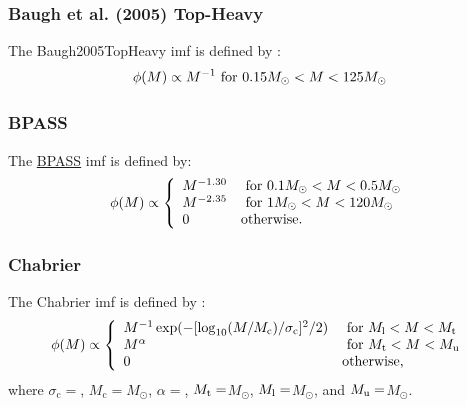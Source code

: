 \subsubsection{Baugh et al. (2005) Top-Heavy}

The {\normalfont \ttfamily Baugh2005TopHeavy} \gls{imf} is defined by \citep{baugh_can_2005}:
\begin{equation}
 \phi(M) \propto 
 M^{-1} \hbox{ for } 0.15M_\odot < M < 125M_\odot
\end{equation}

\subsubsection{BPASS}

The \href{http://www.bpass.org.uk/}{\normalfont \ttfamily BPASS} \gls{imf} is defined by:
\begin{equation}
 \phi(M) \propto \left\{ \begin{array}{ll}
 M^{-1.30} & \hbox{ for } 0.1M_\odot < M < 0.5M_\odot \\ 
 M^{-2.35} & \hbox{ for } 1M_\odot < M < 120M_\odot \\ 
0 & \hbox {otherwise.} \end{array} \right.
\end{equation}

\subsubsection{Chabrier}

The {\normalfont \ttfamily Chabrier} \gls{imf} is defined by \citep{chabrier_galactic_2001}:
\begin{equation}
 \phi(M) \propto \left\{ \begin{array}{ll}
 M^{-1} \exp(-[\log_{10}(M/M_{\mathrm c})/\sigma_{\mathrm c}]^2/2) & \hbox{ for } M_{\rm l} < M < M_{\rm t}  \\
 M^\alpha & \hbox{ for } M_{\rm t} < M < M_{\rm u} \\
 0 & \hbox {otherwise,} \end{array} \right.
\end{equation}
where $\sigma_{\mathrm c}=${\normalfont \ttfamily [imfChabrierSigma]}, $M_{\mathrm c}=${\normalfont \ttfamily [imfChabrierMass]}$M_\odot$, $\alpha=${\normalfont \ttfamily [imfChabrierExponent]}, $M_{\rm t}=${\normalfont \ttfamily [imfChabrierMassTransition]}$M_\odot$, $M_{\rm l}=${\normalfont \ttfamily [imfChabrierMassLower]}$M_\odot$, and $M_{\rm u}=${\normalfont \ttfamily [imfChabrierMassUpper]}$M_\odot$.

